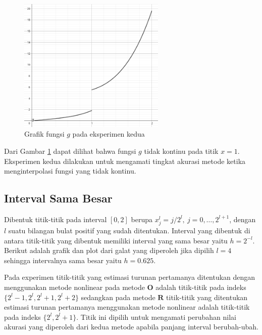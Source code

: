\begin{figure}[H]
    \centering
    \includegraphics[width=7cm]{Images/figure_2/percobaanDua.png}
    \caption{Grafik fungsi $g$ pada eksperimen kedua}
    \label{grafikg2}
\end{figure}

Dari Gambar \ref{grafikg2} dapat dilihat bahwa fungsi $g$ tidak kontinu pada titik \mbox{$x=1$}. Eksperimen kedua dilakukan untuk mengamati tingkat akurasi metode ketika menginterpolasi fungsi yang tidak kontinu.

\subsection{Interval Sama Besar}
Dibentuk titik-titik pada interval $[0,2]$ berupa $x_j^l = j/2^l, ~ j=0,\dots,2^{l+1}$, dengan $l$ suatu bilangan bulat positif yang sudah ditentukan. Interval yang dibentuk di antara titik-titik yang dibentuk memiliki interval yang sama besar yaitu $h = 2^{-l}$. Berikut adalah grafik dan plot dari galat yang diperoleh jika dipilih $l = 4$ sehingga intervalnya sama besar yaitu $h=0.625$. 

Pada experimen titik-titik yang estimasi turunan pertamanya ditentukan dengan menggunakan metode nonlinear pada metode $\textbf{O}$ adalah titik-titik pada indeks $\{2^l-1, 2^l, 2^l+1, 2^l+2\}$ sedangkan pada metode $\textbf{R}$ titik-titik yang ditentukan estimasi turunan pertamanya menggunakan metode nonlinear adalah titik-titik pada indeks $\{2^l, 2^l+1\}$. Titik ini dipilih untuk mengamati perubahan nilai akurasi yang diperoleh dari kedua metode apabila panjang interval berubah-ubah.

